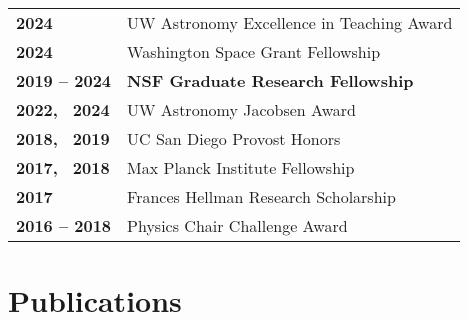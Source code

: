 \documentclass[a4,11pt]{article}
\newcommand{\hskills}[1]{
\textbf{\bfseries #1} }
\let\orighref\href
\renewcommand{\href}[2]{\orighref{#1}{#2\,\scriptsize\faExternalLink}}
\begin{document}
\begin{tabular}[t]{ p{9em} p{50em}}
\hskills{2024} & UW Astronomy Excellence in Teaching Award \\
\hskills{2024} & Washington Space Grant Fellowship \\
\hskills{2019 -- 2024} & \textbf{NSF Graduate Research Fellowship} \\ %
\hskills{2022, \, 2024} & UW Astronomy Jacobsen Award  \\
\hskills{2018, \, 2019} & UC San Diego Provost Honors  \\ %
\hskills{2017, \, 2018} & Max Planck Institute Fellowship \\ %
\hskills{2017} & Frances Hellman Research Scholarship \\  %
\hskills{2016 -- 2018} & Physics Chair Challenge Award \\ %
\end{tabular} 


\section{Publications} 


\end{document}
